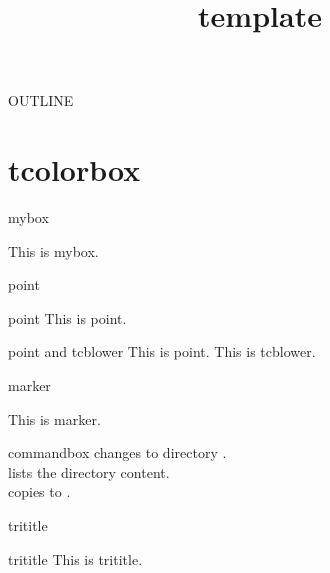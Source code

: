 \documentclass[aspectratio=169]{beamer}
\title{template}
\institute{}
\author{}
\date{\empty}
\begin{document}
    \maketitle

    \begin{frame}{OUTLINE}{}
        \tableofcontents
    \end{frame}

    \section{tcolorbox}

    \begin{frame}{mybox}{}
        \begin{mybox}
            This is mybox.
        \end{mybox}
    \end{frame}

    \begin{frame}{point}{}
        \begin{point}{point}
            This is point.
        \end{point}

        \begin{point}{point and tcblower}
            This is point.
            \tcblower
            This is tcblower.
        \end{point}
    \end{frame}

    \begin{frame}{marker}{}
        \begin{marker}
            This is marker.
        \end{marker}
    \end{frame}

    \begin{frame}[fragile]{commandbox}{}
         changes to directory . \\
         lists the directory content. \\
         copies  to
        .
    \end{frame}

    \begin{frame}{trititle}{}
        \begin{trititle}{trititle}
            This is trititle.
        \end{trititle}
    \end{frame}
\end{document}
